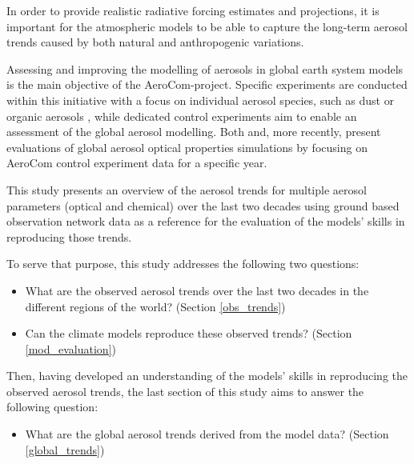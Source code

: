 \documentclass[acp, manuscript]{copernicus}
\begin{document}
In order to provide realistic radiative forcing estimates and projections, it is important for the atmospheric models to be able to capture the long-term aerosol trends caused by both natural and anthropogenic variations.


Assessing and improving the modelling of aerosols in global earth system models is the main objective of the AeroCom-project. Specific experiments are conducted within this initiative with a focus on individual aerosol species, such as dust \citep{Huneeus-acp-2011} or organic aerosols \citep{Tsigaridis-acp-2014}, while dedicated control experiments aim to enable an assessment of the global aerosol modelling. Both \cite{kinne-acp-2006} and, more recently, \cite{jonaseval} present evaluations of global aerosol optical properties simulations by focusing on AeroCom control experiment data for a specific year.

This study presents an overview of the aerosol trends for multiple aerosol parameters (optical and chemical) over the last two decades using ground based observation network data as a reference for the evaluation of the models' skills in reproducing those trends.

To serve that purpose, this study addresses the following two questions:
\begin{itemize}
    \item What are the observed aerosol trends over the last two decades in the different regions of the world? (Section \ref{obs_trends})
    \item Can the climate models reproduce these observed trends? (Section \ref{mod_evaluation})
\end{itemize}

Then, having developed an understanding of the models' skills in reproducing the observed aerosol trends, the last section of this study aims to answer the following question:
\begin{itemize}
    \item What are the global aerosol trends derived from the model data? (Section \ref{global_trends})
\end{itemize}
\end{document}
